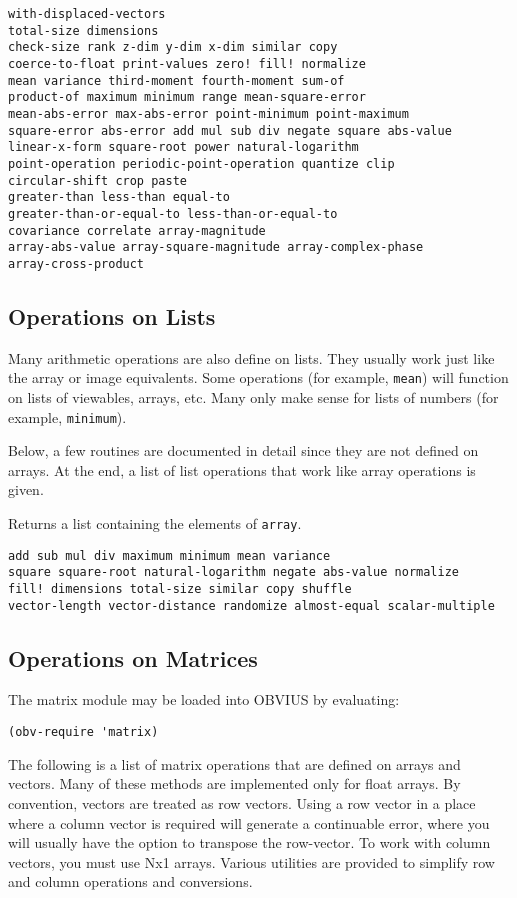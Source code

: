 \begin{verbatim}
with-displaced-vectors
total-size dimensions
check-size rank z-dim y-dim x-dim similar copy
coerce-to-float print-values zero! fill! normalize
mean variance third-moment fourth-moment sum-of
product-of maximum minimum range mean-square-error
mean-abs-error max-abs-error point-minimum point-maximum
square-error abs-error add mul sub div negate square abs-value
linear-x-form square-root power natural-logarithm
point-operation periodic-point-operation quantize clip
circular-shift crop paste 
greater-than less-than equal-to
greater-than-or-equal-to less-than-or-equal-to 
covariance correlate array-magnitude
array-abs-value array-square-magnitude array-complex-phase
array-cross-product
\end{verbatim}


\subsection{Operations on Lists}
Many arithmetic operations are also define on lists.
They usually work just like the array or image equivalents.
Some operations (for example, {\tt mean})
will function on lists of viewables, arrays, etc.
Many only make sense for lists of numbers
(for example, {\tt minimum}).

Below, a few routines are documented in detail since they are
not defined on arrays. At the end, a list of list operations 
that work like array operations is given.
\begin{description}
\item{}
Returns a list containing the elements of {\tt array}.
\end{description}

\begin{verbatim}
add sub mul div maximum minimum mean variance
square square-root natural-logarithm negate abs-value normalize
fill! dimensions total-size similar copy shuffle 
vector-length vector-distance randomize almost-equal scalar-multiple 
\end{verbatim}


\subsection{Operations on Matrices}

The matrix module may be loaded into OBVIUS by evaluating:
\begin{verbatim}
(obv-require 'matrix)
\end{verbatim}
The following is a list of matrix operations that are defined on
arrays and vectors.  Many of these methods are implemented only for
float arrays.  By convention, vectors are treated as row vectors.
Using a row vector in a place where a column vector is required will
generate a continuable error, where you will usually have the option to
transpose the row-vector.  To work with column vectors, you must use
Nx1 arrays.  Various utilities are provided to simplify row and column
operations and conversions.


